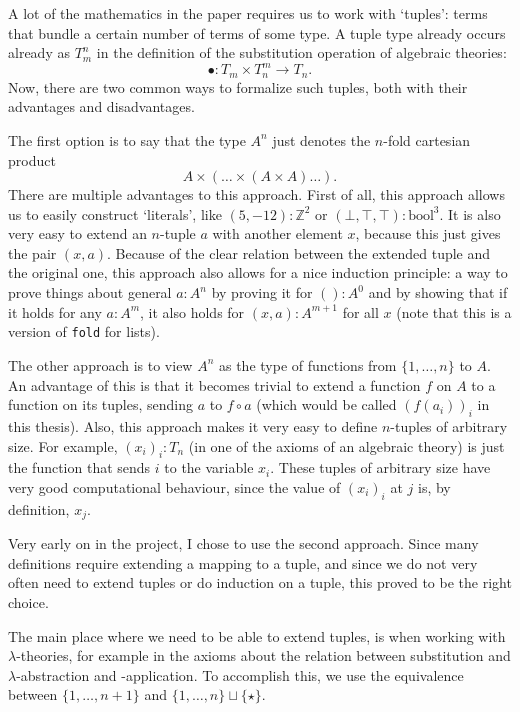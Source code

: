 A lot of the mathematics in the paper requires us to work with `tuples': terms that bundle a certain number of terms of some type. A tuple type already occurs already as $ T_m^n $ in the definition of the substitution operation of algebraic theories:
\[ \bullet: T_m \times T_n^m \to T_n. \]
Now, there are two common ways to formalize such tuples, both with their advantages and disadvantages.

The first option is to say that the type $ A^n $ just denotes the $ n $-fold cartesian product
\[ A \times (\dots \times (A \times A) \dots). \]
There are multiple advantages to this approach. First of all, this approach allows us to easily construct `literals', like $ (5, -12) : \mathbb Z^2 $ or $ (\bot, \top, \top) : \mathrm{bool}^3 $. It is also very easy to extend an $ n $-tuple $ a $ with another element $ x $, because this just gives the pair $ (x, a) $. Because of the clear relation between the extended tuple and the original one, this approach also allows for a nice induction principle: a way to prove things about general $ a : A^n $ by proving it for $ () : A^0 $ and by showing that if it holds for any $ a : A^m $, it also holds for $ (x, a) : A^{m + 1} $ for all $ x $ (note that this is a version of \texttt{fold} for lists).

The other approach is to view $ A^n $ as the type of functions from $ \{ 1, \dots, n \} $ to $ A $. An advantage of this is that it becomes trivial to extend a function $ f $ on $ A $ to a function on its tuples, sending $ a $ to $ f \circ a $ (which would be called $ (f(a_i))_i $ in this thesis). Also, this approach makes it very easy to define $ n $-tuples of arbitrary size. For example, $ (x_i)_i : T_n $ (in one of the axioms of an algebraic theory) is just the function that sends $ i $ to the variable $ x_i $. These tuples of arbitrary size have very good computational behaviour, since the value of $ (x_i)_i $ at $ j $ is, by definition, $ x_j $.

Very early on in the project, I chose to use the second approach. Since many definitions require extending a mapping to a tuple, and since we do not very often need to extend tuples or do induction on a tuple, this proved to be the right choice.

The main place where we need to be able to extend tuples, is when working with $ \lambda $-theories, for example in the axioms about the relation between substitution and $ \lambda $-abstraction and -application. To accomplish this, we use the equivalence between $ \{ 1, \dots, n + 1 \} $ and $ \{ 1, \dots, n \} \sqcup \{ \star \} $.

